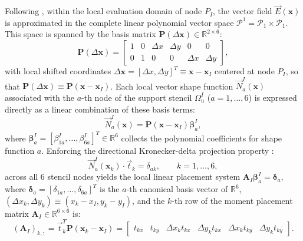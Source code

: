 \documentclass[VANCOUVER]{USG}
\begin{document}
Following \cite{stable_vnmm2d_2026}, within the local evaluation domain of node $P_I$, the vector field $\vec{E}(\mathbf{x})$ is approximated in the complete linear polynomial vector space $\mathcal{P}^1 = \mathcal{P}_1 \times \mathcal{P}_1$. This space is spanned by the basis matrix $\mathbf{P}(\Delta\mathbf{x}) \in \mathbb{R}^{2 \times 6}$:
\begin{equation}
    \mathbf{P}(\Delta\mathbf{x}) = \begin{bmatrix}
        1 & 0 & \Delta x & \Delta y & 0        & 0        \\
        0 & 1 & 0        & 0        & \Delta x & \Delta y
    \end{bmatrix},
    \label{eq:P_basis_matrix}
\end{equation}
with local shifted coordinates $\Delta\mathbf{x} = [\Delta x, \Delta y]^T \equiv \mathbf{x} - \mathbf{x}_I$ centered at node $P_I$, so that $\mathbf{P}(\Delta\mathbf{x}) \equiv \mathbf{P}(\mathbf{x} - \mathbf{x}_I)$.
Each local vector shape function $\vec{N}_a^I(\mathbf{x})$ associated with the $a$-th node of the support stencil $\Omega_u^I$ ($a = 1, \dots, 6$) is expressed directly as a linear combination of these basis terms:
\begin{equation}
    \vec{N}_a^I(\mathbf{x}) = \mathbf{P}(\mathbf{x} - \mathbf{x}_I) \boldsymbol{\beta}_a^I,
    \label{eq:P1_shape_function_expansion_mlpg}
\end{equation}
where $\boldsymbol{\beta}_a^I = [\beta_{1a}^I, \dots, \beta_{6a}^I]^T \in \mathbb{R}^6$ collects the polynomial coefficients for shape function $a$. Enforcing the directional Kronecker-delta projection property \cite{stable_vnmm2d_2026}:
\begin{equation}
    \vec{N}_a^I(\mathbf{x}_k) \cdot \vec{t}_k = \delta_{ak}, \qquad k = 1, \dots, 6,
    \label{eq:kronecker_projection}
\end{equation}
across all 6 stencil nodes yields the local linear placement system $\mathbf{A}_I \boldsymbol{\beta}_a^I = \boldsymbol{\delta}_a$, where $\boldsymbol{\delta}_a = [\delta_{1a}, \dots, \delta_{6a}]^T$ is the $a$-th canonical basis vector of $\mathbb{R}^6$, $(\Delta x_k, \Delta y_k) \equiv (x_k - x_I, y_k - y_I)$, and the $k$-th row of the moment placement matrix $\mathbf{A}_I \in \mathbb{R}^{6 \times 6}$ is:
\begin{equation}
    (\mathbf{A}_I)_{k, :} = \vec{t}_k^T \mathbf{P}(\mathbf{x}_k - \mathbf{x}_I) = \begin{bmatrix} t_{kx} & t_{ky} & \Delta x_k t_{kx} & \Delta y_k t_{kx} & \Delta x_k t_{ky} & \Delta y_k t_{ky} \end{bmatrix}.
    \label{eq:matrix_A_row}
\end{equation}
\end{document}
